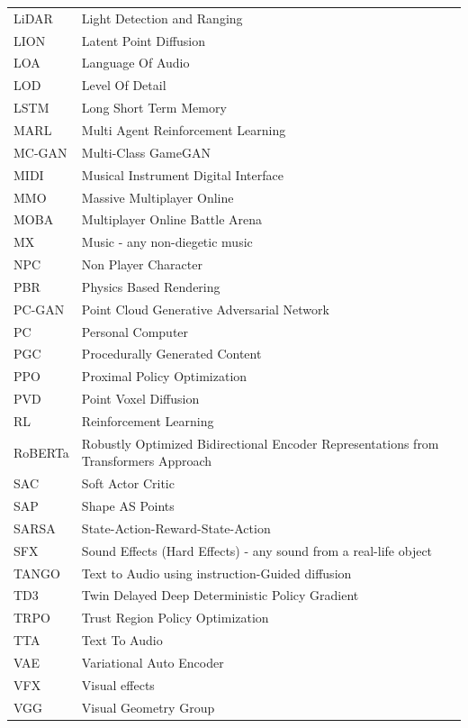\documentclass[a4paper,one side,12pt]{book}
\newcommand\blankpage{%
    \null
    \thispagestyle{empty}%
    \addtocounter{page}{-1}%
    \newpage}
\begin{document}
\begin{longtable} {m{10em} m{20em}}
LiDAR&Light Detection and Ranging\\
LION&  Latent Point Diffusion\\
LOA & Language Of Audio\\
LOD&Level Of Detail\\
LSTM& Long Short Term Memory\\
MARL& Multi Agent Reinforcement Learning\\
MC-GAN& Multi-Class GameGAN\\
MIDI & Musical Instrument Digital Interface\\
MMO& Massive Multiplayer Online\\
MOBA&Multiplayer Online Battle Arena\\
MX & Music - any non-diegetic music\\
NPC&Non Player Character\\
PBR&Physics Based Rendering\\
PC-GAN & Point Cloud Generative Adversarial Network\\
PC&Personal Computer\\
PGC&Procedurally Generated Content\\
PPO&Proximal Policy Optimization\\
PVD&Point Voxel Diffusion\\
RL& Reinforcement Learning\\
RoBERTa&Robustly Optimized Bidirectional Encoder Representations from Transformers Approach\\
SAC&Soft Actor Critic\\
SAP& Shape AS Points\\
SARSA&State-Action-Reward-State-Action\\
SFX & Sound Effects (Hard Effects) - any sound from a real-life object\\
TANGO&Text to Audio using instruction-Guided diffusion \\
TD3& Twin Delayed Deep Deterministic Policy Gradient\\
TRPO& Trust Region Policy Optimization\\
TTA&Text To Audio\\
VAE& Variational Auto Encoder\\
VFX & Visual effects\\
VGG& Visual Geometry Group\\

\end{longtable}

\mainmatter

\blankpage
\end{document}
